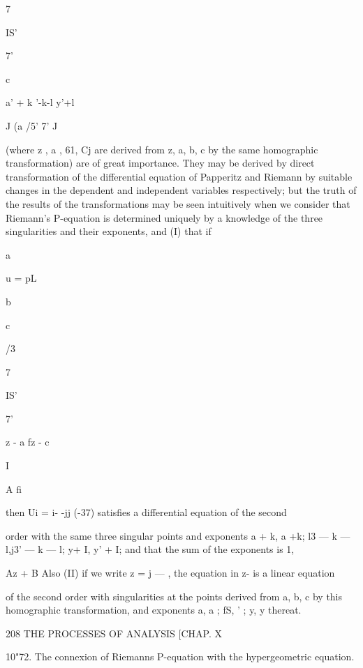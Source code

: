   


7 


IS' 


7' 



c 



a' + k  '-k-l y'+l 



J (a /5' 7' J 

(where z , a , 61, Cj are derived from z, a, b, c by the same homographic 
transformation) are of great importance. They may be derived by direct 
transformation of the differential equation of Papperitz and Riemann by 
suitable changes in the dependent and independent variables respectively; 
but the truth of the results of the transformations may be seen intuitively 
when we consider that Riemann's P-equation is determined uniquely by a 
knowledge of the three singularities and their exponents, and (I) that if 





a 

u = pL 


b 


c 




/3 


7 




IS' 


7' 


z - a\* fz - c\ 


I 




A fi 



then Ui = i- -jj (-37)   satisfies a differential equation of the second 

order with the same three singular points and exponents a + k, a +k; 
l3 — k — l,j3' — k — l; y+ I, y' + I; and that the sum of the exponents is 1, 

Az + B 
Also (II) if we write z = j  —   , the equation in z-  is a linear equation 

of the second order with singularities at the points derived from a, b, c by this 
homographic transformation, and exponents a, a ; fS,  ' ; y, y thereat. 



208 THE PROCESSES OF ANALYSIS [CHAP. X 

10"72. The connexion of Riemanns P-equation with the hypergeometric 
equation. 

